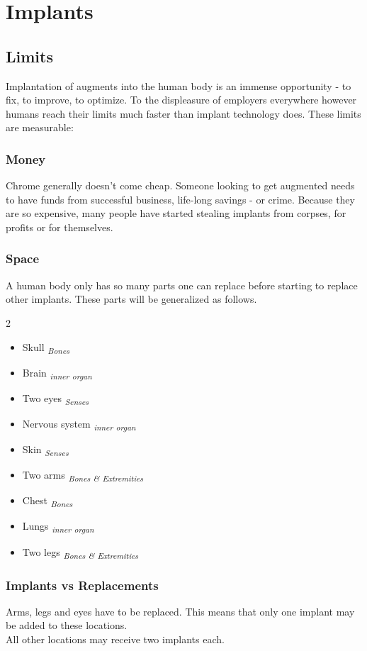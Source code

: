 	\section{Implants}
\subsection{Limits}
Implantation of augments into the human body is an immense opportunity - to fix, to improve, to optimize. To the displeasure of employers everywhere however humans reach their limits much faster than implant technology does. These limits are measurable:
	\subsubsection{Money}
	Chrome generally doesn't come cheap. Someone looking to get augmented needs to have funds from successful business, life-long savings - or crime. Because they are so expensive, many people have started stealing implants from corpses, for profits or for themselves.
	\subsubsection{Space}
	A human body only has so many parts one can replace before starting to replace other implants. These parts will be generalized as follows.
	\begin{multicols}{2}
	\begin{itemize}
		\setlength\itemsep{-10mm}
		\item Skull \textsubscript{\itshape Bones}
		\item Brain \textsubscript{\itshape inner organ}
		\item Two eyes \textsubscript{\itshape Senses}
		\item Nervous system \textsubscript{\itshape inner organ}
		\item Skin \textsubscript{\itshape Senses}
		\item Two arms \textsubscript{\itshape Bones \& Extremities}
		\item Chest \textsubscript{\itshape Bones}
		\item Lungs \textsubscript{\itshape inner organ}
		\item Two legs \textsubscript{\itshape Bones \& Extremities}
	\end{itemize}
	\end{multicols}
	\begin{exampleblock}
		\subsubsection*{Implants vs Replacements}
		Arms, legs and eyes have to be replaced.
		This means that only one implant may be added to these locations.
		\\%
		All other locations may receive two implants each.
	\end{exampleblock}
